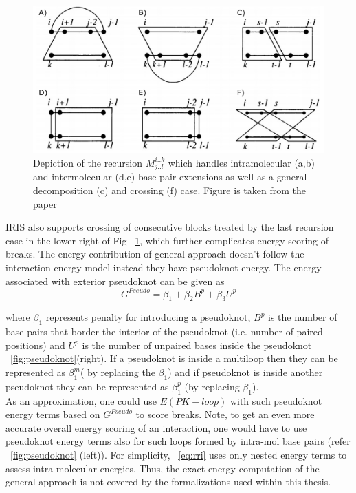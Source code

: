 \documentclass[twoside,a4paper]{report}
\numberwithin{equation}{section}
\begin{document}
	\begin{figure}[tb]
		\includegraphics[width=0.9\linewidth]{iris.pdf}
		\centering
		\caption{ Depiction of the recursion $M^{i..k}_{j..l}$  which
			handles intramolecular (a,b) and intermolecular (d,e) base pair extensions as well as a general decomposition (c) and crossing (f) case.  Figure is taken from the paper \citet{pervouchine2004iris}} 
		
		\label{fig:iris}
	\end{figure}
	
	IRIS also supports crossing of consecutive blocks treated by the last recursion case in the lower right of Fig ~\ref{fig:iris}, which further complicates energy scoring of breaks. The energy contribution of general approach doesn't follow the interaction energy model instead they have pseudoknot energy. The energy associated with exterior pseudoknot can be given as \citep{xu2015physics} \\
	
		\begin{equation}
		G^{Pseudo} = \beta_1 + \beta_2 B^p + \beta_3 U^p
		\end{equation}
		
	where $\beta_1$ represents penalty for introducing a pseudoknot, $B^p$ is the number of base pairs that border the interior of the pseudoknot (i.e. number of paired positions) and $U^p$ is the number of unpaired bases inside the pseudoknot ~\ref{fig:pseudoknot}(right). If a pseudoknot is inside a multiloop then they can be represented as $\beta_1^m$( by replacing the $\beta_1$) and if pseudoknot is inside another pseudoknot they can be  represented as $\beta_1^p$ (by replacing $\beta_1$).\\
	
	As an approximation, one could use $E(PK-loop)$ with such pseudoknot energy terms based on $G^{Pseudo}$ to score breaks. Note, to get an even more accurate overall energy scoring of an interaction, one would have to use pseudoknot energy terms also for such loops formed by intra-mol base pairs (refer ~\ref{fig:pseudoknot} (left)). For simplicity, ~\ref{eq:rri} uses only nested energy terms to assess intra-molecular energies. Thus, the exact energy computation of the general approach is not covered by the formalizations used within this thesis.\\
\end{document}
